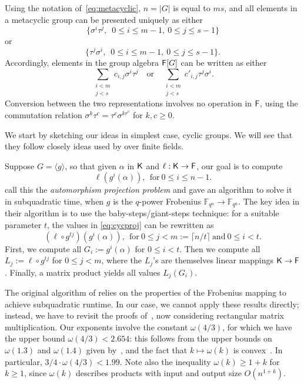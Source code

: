 Using the notation of~\eqref{eq:metacyclic}, $n=|G|$ is equal to $ms$, and
all elements in a metacyclic group can be presented uniquely as either
\begin{equation}\label{pres1}
\{\sigma^i \tau^j,\,\,\, 0\leq i \leq m-1,\ 0\leq j \leq s-1\}  
\end{equation}
or
\begin{equation}\label{pres2}
\{ \tau^j\sigma^i,\,\,\, 0\leq i \leq m-1,\ 0\leq j \leq s-1\}.
\end{equation}
Accordingly, elements in the group algebra ${\mathsf{F}}[G]$ can be written as 
either 
$$\sum_{\substack{i <m\\ j< s}} c_{i,j} \sigma^i \tau^j \quad\text{or}\quad
\sum_{\substack{i <m\\ j< s}} c'_{i,j} \tau^j \sigma^i.$$
Conversion between the two representations involves no operation in ${\mathsf{F}}$,
using the commutation relation $\sigma^k \tau^c = \tau^c \sigma^{kr^c}$
for $k,c \ge 0$.

We start by sketching our
ideas in simplest case, cyclic groups.  We will see that they follow
closely ideas used by \cite{KalSho98} over finite fields.

Suppose $G = \langle g \rangle$, so that given $\alpha$ in ${\mathsf{K}}$ and
$\ell: {\mathsf{K}} \to {\mathsf{F}}$, our goal is to compute
\begin{equation}
  \label{eq:cycproj}
  \ell(g^i(\alpha)), ~~\mbox{for}~ 0\leq i\leq n-1.
\end{equation}
\cite{KalSho98} call this the \emph{automorphism projection problem} and
gave an algorithm to solve it in subquadratic time, when $g$ is the
$q$-power Frobenius $\mathbb{F}_{q^n} \to \mathbb{F}_{q^n}$.  The key idea in their
algorithm is to use the baby-steps/giant-steps technique: for a suitable
parameter $t$, the values in \eqref{eq:cycproj} can be rewritten as
\[
  (\ell \circ g^{tj})(g^i(\alpha)), ~~\mbox{for}~ 0 \leq j < m:=\lceil n/t
  \rceil ~\mbox{and}~ 0 \leq i <t.
\]
First, we compute all $G_i:=g^i(\alpha)$ for $0 \leq i <t$.  Then we compute
all $L_j:=\ell \circ g^{tj}$ for $0 \leq j <m$, where the $L_j$'s are
themselves linear mappings ${\mathsf{K}} \to {\mathsf{F}}$.  Finally, a matrix product yields
all values $L_j(G_i)$.

The original algorithm of \cite{KalSho98} relies on the properties of
the Frobenius mapping to achieve subquadratic runtime. In our case, we
cannot apply these results directly; instead, we have to revisit the
proofs of~\cite[Lemmata 3 and 4]{KalSho98}, now considering
rectangular matrix multiplication.  Our exponents involve the constant
$\omega(4/3)$, for which we have the upper bound $\omega(4/3) <
2.654$: this follows from the upper bounds on $\omega(1.3)$ and
$\omega(1.4)$ given by~\cite{LeGall}, and the fact that $k \mapsto
\omega(k)$ is convex~\citep{LoRo83}. In particular, $3/4 \cdot
\omega(4/3) < 1.99$. Note also the inequality $\omega(k) \ge 1+k$ for
$k\ge 1$, since $\omega(k)$ describes products with input and output
size $O(n^{1+k})$.

